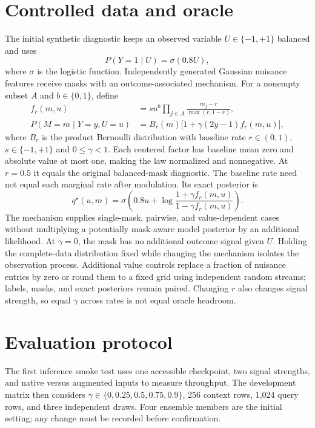 \documentclass[10pt]{article}
\begin{document}
\section{Controlled data and oracle}
The initial synthetic diagnostic keeps an observed variable $U\in\{-1,+1\}$ balanced and uses
\begin{equation}
 P(Y=1\mid U)=\sigma(0.8U),
\end{equation}
where $\sigma$ is the logistic function. Independently generated Gaussian nuisance features receive masks with an outcome-associated mechanism. For a nonempty subset $A$ and $b\in\{0,1\}$, define
\begin{align}
 f_r(m,u)&=s u^{b}\prod_{j\in A}\frac{m_j-r}{\max(r,1-r)},\\
 P(M=m\mid Y=y,U=u)&=B_r(m)\bigl[1+\gamma(2y-1)f_r(m,u)\bigr],
 \label{eq:mechanism}
\end{align}
where $B_r$ is the product Bernoulli distribution with baseline rate $r\in(0,1)$, $s\in\{-1,+1\}$ and $0\leq\gamma<1$. Each centered factor has baseline mean zero and absolute value at most one, making the law normalized and nonnegative. At $r=0.5$ it equals the original balanced-mask diagnostic. The baseline rate need not equal each marginal rate after modulation. Its exact posterior is
\begin{equation}
 q^{\star}(u,m)=\sigma\left(0.8u+
 \log\frac{1+\gamma f_r(m,u)}{1-\gamma f_r(m,u)}\right).
 \label{eq:oracle}
\end{equation}
The mechanism supplies single-mask, pairwise, and value-dependent cases without multiplying a potentially mask-aware model posterior by an additional likelihood. At $\gamma=0$, the mask has no additional outcome signal given $U$. Holding the complete-data distribution fixed while changing the mechanism isolates the observation process. Additional value controls replace a fraction of nuisance entries by zero or round them to a fixed grid using independent random streams; labels, masks, and exact posteriors remain paired. Changing $r$ also changes signal strength, so equal $\gamma$ across rates is not equal oracle headroom.

\section{Evaluation protocol}
The first inference smoke test uses one accessible checkpoint, two signal strengths, and native versus augmented inputs to measure throughput. The development matrix then considers $\gamma\in\{0,0.25,0.5,0.75,0.9\}$, 256 context rows, 1,024 query rows, and three independent draws. Four ensemble members are the initial setting; any change must be recorded before confirmation.
\end{document}
